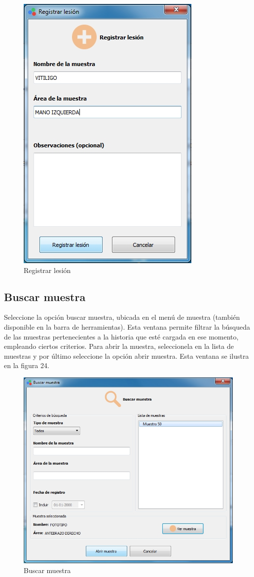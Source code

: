 		
\begin{figure}[H]
  \centering
  \includegraphics[width=.6\linewidth]{./img/registrar-lesion.jpg}
\caption{Registrar lesi\'{o}n}
\end{figure}
	
	\subsection{Buscar muestra}
	
		Seleccione la opci\'{o}n buscar muestra, ubicada en el men\'{u} de muestra (tambi\'{e}n disponible en la barra de herramientas). Esta ventana permite filtrar la b\'{u}squeda de las muestras pertenecientes a la historia que est\'{e} cargada en ese momento, empleando ciertos criterios. Para abrir la muestra, seleccionela en la lista de muestras y por \'{u}ltimo seleccione la opci\'{o}n abrir muestra. Esta ventana se ilustra en la figura 24.
		
\begin{figure}[H]
  \centering
  \includegraphics[width=.9\linewidth]{./img/buscar-muestra.jpg}
\caption{Buscar muestra}
\end{figure}
	
